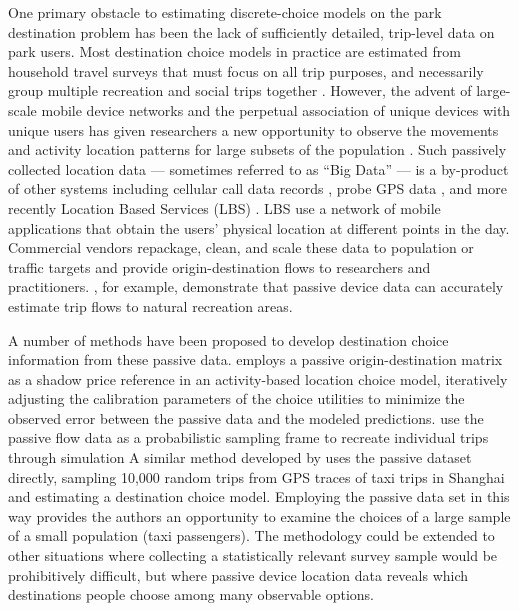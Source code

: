 \documentclass[3p, authoryear, review]{elsarticle} %
\begin{document}
One primary obstacle to estimating discrete-choice models on the park
destination problem has been the lack of sufficiently detailed, trip-level data
on park users. Most destination choice models in practice are estimated from household travel
surveys that must focus on all trip purposes, and necessarily group multiple
recreation and social trips together \citep{nchrp716}. However, the advent of large-scale
mobile device networks and the perpetual association of unique devices with
unique users has given researchers a new opportunity to observe the movements
and activity location patterns for large subsets of the population
\citep{Naboulsi2016}. Such passively collected location data --- sometimes referred
to as ``Big Data'' --- is a by-product of other systems including cellular call
data records \citep[e.g.,][]{Bolla2000, Calabrese2011}, probe GPS data \citep{Huang2015}, and more recently Location Based
Services (LBS) \citep{Roll2019, Komanduri2017}. LBS use a network of mobile
applications that obtain the users' physical location at different points in the
day. Commercial vendors repackage, clean, and scale these data to population or
traffic targets and provide origin-destination flows to researchers and
practitioners. \citet{Monz2019}, for example, demonstrate that passive device data can
accurately estimate trip flows to natural recreation areas.

A number of methods have been proposed to develop destination choice
information from these passive data.
\citet{Bernardin2018} employs a passive origin-destination matrix as a shadow price
reference in an activity-based location choice model, iteratively adjusting the
calibration parameters of the choice
utilities to minimize the observed error between the passive data and the modeled
predictions.
\citet{tf_idea} use the passive flow data
as a probabilistic sampling frame to recreate individual trips through simulation
A similar method developed by \citet{Zhu2018} uses the passive dataset
directly, sampling 10,000 random trips from GPS traces of taxi trips in Shanghai
and estimating a destination choice model. Employing the passive data set in
this way provides the authors an opportunity to examine the choices of a large
sample of a small population (taxi passengers). The \citet{Zhu2018} methodology could
be extended to other situations where collecting a statistically relevant
survey sample would be prohibitively difficult, but where passive device
location data reveals which destinations people choose among many observable
options.
\end{document}

